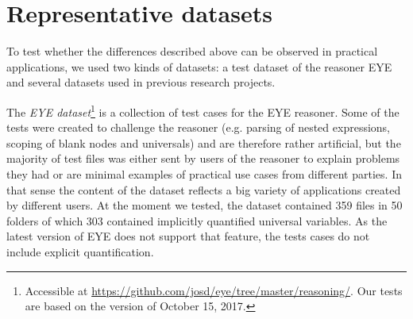 
\section{Representative datasets}\label{data}
To test whether the differences described above can be observed in practical applications,
we used two kinds of datasets: a test dataset of the reasoner 
EYE and several datasets used in previous research projects.

The \emph{EYE dataset}\footnote{Accessible at \url{https://github.com/josd/eye/tree/master/reasoning/}. Our tests are based on the version of October 15, 2017.} 
%
is a collection of test cases for the EYE reasoner.
Some of the tests were created to challenge the reasoner (e.g. parsing of nested expressions, scoping of blank nodes and universals)
and are therefore rather artificial, 
 but the majority of test files was either sent by users of the reasoner to explain problems they had or are minimal examples of practical use cases from different parties.
 In that sense 
 the content of the dataset 
 reflects a big variety of applications created by different users.
 At the moment we tested, the dataset contained 359 \nthree files in 50 folders of which 303 contained implicitly 
quantified universal variables. 
As the latest version of EYE does not support that feature, the tests cases do not include explicit quantification. 

